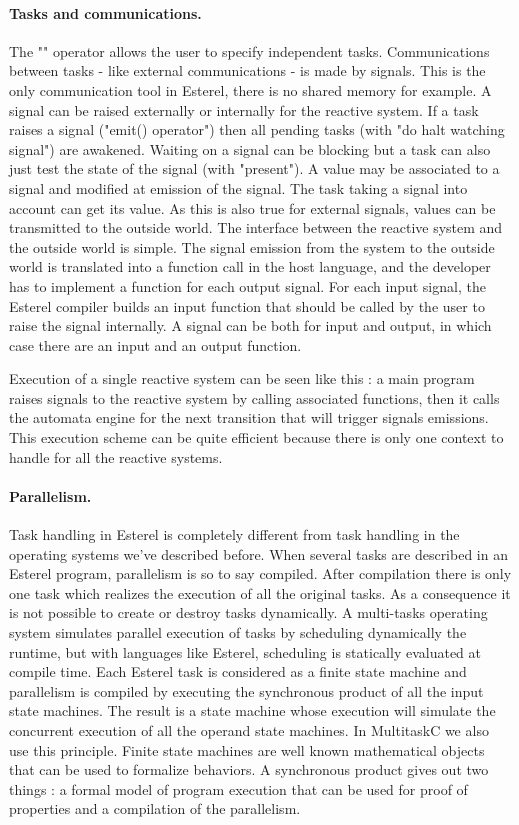 \documentclass[10pt]{report}
\begin{document}
\paragraph{Tasks and communications.} The "\textbar\textbar" operator allows the user to specify independent tasks. Communications between
tasks - like external communications - is made by signals. This is the only communication tool in Esterel, there is no
shared memory for example. A signal can be raised externally or internally for the reactive system. If a task raises a signal ("emit() operator") 
then all pending tasks (with "do halt watching signal") are awakened. Waiting on a signal can be blocking but a task can also just test the state 
of the signal (with "present"). A value may be associated to a signal and modified at emission of the signal. The task taking a signal into account 
can get its value. As this is also true for external signals, values can be transmitted to the outside world. The interface between the reactive
system and the outside world is simple. The signal emission from the system to the outside world is translated into a function call
in the host language, and the developer has to implement a function for each output signal. For each input signal, the Esterel
compiler builds an input function that should be called by the user to raise the signal internally. A signal can be both for
input and output, in which case there are an input and an output function.

Execution of a single reactive system can be seen like this : a main program raises signals to the reactive system by
calling associated functions, then it calls the automata engine for the next transition that will trigger signals emissions. This
execution scheme can be quite efficient because there is only one context to handle for all the reactive systems.

\paragraph{Parallelism.} Task handling in Esterel is completely different from task handling in the operating systems we've described before.
When several tasks are described in an Esterel program, parallelism is so to say compiled. After compilation there is only
one task which realizes the execution of all the original tasks. As a consequence it is not possible to create or destroy tasks dynamically. 
A multi-tasks operating system simulates parallel execution of tasks by scheduling dynamically the runtime, but with languages
like Esterel, scheduling is statically evaluated at compile time. Each Esterel task is considered as a finite state machine
and parallelism is compiled by executing the synchronous product of all the input state machines. The result is a state machine whose
execution will simulate the concurrent execution of all the operand state machines. In MultitaskC we also use this principle. 
Finite state machines are well known mathematical objects that can be used to formalize behaviors. A synchronous product gives out 
two things : a formal model of program execution that can be used for proof of properties and a compilation of the parallelism.
\end{document}
